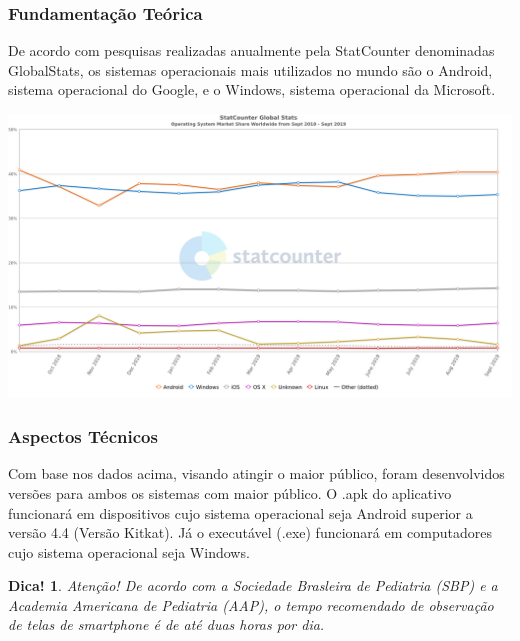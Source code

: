 \documentclass[10pt]{beamer}
\newtheorem{hint}[theorem]{Dica!}
\begin{document}

\begin{frame}
	\frametitle{Fundamentação Teórica}

De acordo com pesquisas realizadas anualmente pela StatCounter denominadas GlobalStats, os sistemas operacionais mais utilizados no mundo são o Android, sistema operacional do Google, e o Windows, sistema operacional da Microsoft. \pause


\begin{center}
	\includegraphics[width=0.8\linewidth]{StatCounter-os_research.png}
\end{center}




\end{frame}


\begin{frame}
	\frametitle{Aspectos Técnicos}
	
	
	Com base nos dados acima, visando atingir o maior público, foram desenvolvidos versões para ambos
	os sistemas com maior público. O .apk do aplicativo funcionará em dispositivos cujo sistema operacional seja Android superior a versão 4.4 (Versão Kitkat). Já o executável (.exe) funcionará em computadores cujo sistema operacional seja Windows. \pause
	
	\begin{hint}
		Atenção! De acordo com a Sociedade Brasleira de Pediatria (SBP) e a Academia Americana de Pediatria (AAP), o tempo recomendado de observação de telas de smartphone é de até duas horas por dia. 
	\end{hint}
	
	
\end{frame}

\end{document}
